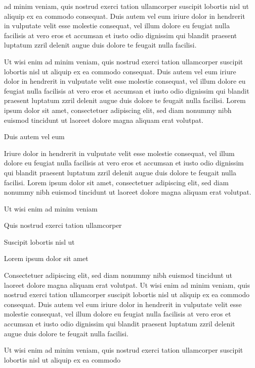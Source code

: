 \documentclass[11pt,twoside]{article}\makeatletter
\begin{document}
      ad minim veniam, quis nostrud exerci tation ullamcorper suscipit
      lobortis nisl ut aliquip ex ea commodo consequat. Duis autem vel eum
      iriure dolor in hendrerit in vulputate velit esse molestie consequat,
      vel illum dolore eu feugiat nulla facilisis at vero eros et accumsan
      et iusto odio dignissim qui blandit praesent luptatum zzril delenit
      augue duis dolore te feugait nulla facilisi.\par Ut wisi enim ad minim veniam, quis nostrud exerci tation
      ullamcorper suscipit lobortis nisl ut aliquip ex ea commodo
      consequat. Duis autem vel eum iriure dolor in hendrerit in vulputate
      velit esse molestie consequat, vel illum dolore eu feugiat nulla
      facilisis at vero eros et accumsan et iusto odio dignissim qui blandit
      praesent luptatum zzril delenit augue duis dolore te feugait nulla
      facilisi. Lorem ipsum dolor sit amet, consectetuer adipiscing elit,
      sed diam nonummy nibh euismod tincidunt ut laoreet dolore magna
      aliquam erat volutpat. \par Duis autem vel eum \par Iriure dolor in hendrerit in vulputate velit esse molestie
      consequat, vel illum dolore eu feugiat nulla facilisis at vero eros et
      accumsan et iusto odio dignissim qui blandit praesent luptatum zzril
      delenit augue duis dolore te feugait nulla facilisi. Lorem ipsum dolor
      sit amet, consectetuer adipiscing elit, sed diam nonummy nibh euismod
      tincidunt ut laoreet dolore magna aliquam erat volutpat. \par Ut wisi enim ad minim veniam\par Quis nostrud exerci tation ullamcorper \par Suscipit lobortis nisl ut \par Lorem ipsum dolor sit amet\par Consectetuer adipiscing elit, sed diam nonummy nibh euismod
      tincidunt ut laoreet dolore magna aliquam erat volutpat. Ut wisi enim
      ad minim veniam, quis nostrud exerci tation ullamcorper suscipit
      lobortis nisl ut aliquip ex ea commodo consequat. Duis autem vel eum
      iriure dolor in hendrerit in vulputate velit esse molestie consequat,
      vel illum dolore eu feugiat nulla facilisis at vero eros et accumsan
      et iusto odio dignissim qui blandit praesent luptatum zzril delenit
      augue duis dolore te feugait nulla facilisi.\par Ut wisi enim ad minim veniam, quis nostrud exerci tation
      ullamcorper suscipit lobortis nisl ut aliquip ex ea commodo
\end{document}
